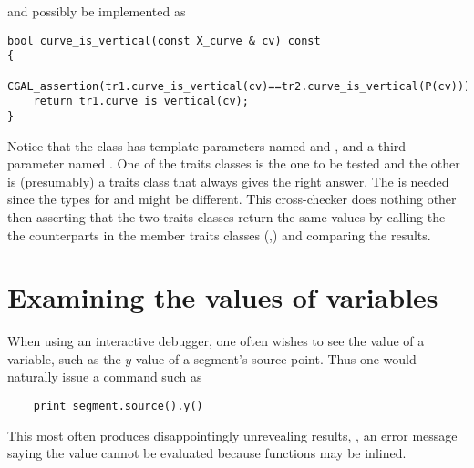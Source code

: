 and possibly be implemented as 

\begin{verbatim}
bool curve_is_vertical(const X_curve & cv) const
{
    CGAL_assertion(tr1.curve_is_vertical(cv)==tr2.curve_is_vertical(P(cv)));
    return tr1.curve_is_vertical(cv);
}
\end{verbatim}

Notice that the class  has template parameters 
named  and , and a third parameter named 
. One of the traits classes is the one to be tested and the
other is (presumably) a traits class that always gives the right answer.
The  is needed since the  types 
for  and  might be different. 
This cross-checker does nothing other then asserting that the two traits 
classes return the same values by calling the 
the counterparts in the member traits classes 
(,) and comparing the results.


\section{Examining the values of variables}
\label{sec:debugging_handles_and_it}

When using an interactive debugger, one often wishes to see the value of
a variable, such as the $y$-value of a segment's source point. Thus one
would naturally issue a command such as
\begin{verbatim}
    print segment.source().y()
\end{verbatim}
This most often produces disappointingly unrevealing results, \eg, an
error message saying the value cannot be evaluated because functions may
be inlined.  

